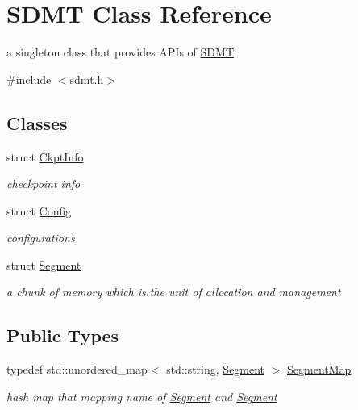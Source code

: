 \hypertarget{class_s_d_m_t}{}\section{S\+D\+MT Class Reference}
\label{class_s_d_m_t}


a singleton class that provides A\+P\+Is of \hyperlink{class_s_d_m_t}{S\+D\+MT}  




{\ttfamily \#include $<$sdmt.\+h$>$}

\subsection*{Classes}
\begin{DoxyCompactItemize}
\item 
struct \hyperlink{struct_s_d_m_t_1_1_ckpt_info}{Ckpt\+Info}
\begin{DoxyCompactList}\small\item\em checkpoint info \end{DoxyCompactList}\item 
struct \hyperlink{struct_s_d_m_t_1_1_config}{Config}
\begin{DoxyCompactList}\small\item\em configurations \end{DoxyCompactList}\item 
struct \hyperlink{struct_s_d_m_t_1_1_segment}{Segment}
\begin{DoxyCompactList}\small\item\em a chunk of memory which is the unit of allocation and management \end{DoxyCompactList}\end{DoxyCompactItemize}
\subsection*{Public Types}
\begin{DoxyCompactItemize}
\item 
\mbox{\label{class_s_d_m_t_ab60c4624d197b2cf048ca65243d5bc53}} 
typedef std\+::unordered\+\_\+map$<$ std\+::string, \hyperlink{struct_s_d_m_t_1_1_segment}{Segment} $>$ \hyperlink{class_s_d_m_t_ab60c4624d197b2cf048ca65243d5bc53}{Segment\+Map}
\begin{DoxyCompactList}\small\item\em hash map that mapping name of \hyperlink{struct_s_d_m_t_1_1_segment}{Segment} and \hyperlink{struct_s_d_m_t_1_1_segment}{Segment} \end{DoxyCompactList}\end{DoxyCompactItemize}
